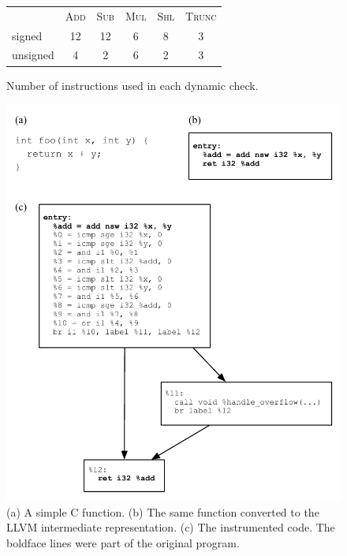 \documentclass[preprint]{sigplanconf}[10pt]
\begin{document}
\begin{figure}[t!]
\begin{center}
\begin{small}
\renewcommand{\arraystretch}{1.5}
\begin{tabular}{lccccc}
& \textsc{Add} & \textsc{Sub} & \textsc{Mul} & \textsc{Shl} & \textsc{Trunc} \\
signed   & 12 & 12 & 6 & 8 & 3 \\
unsigned & 4  & 2  & 6 & 2 & 3
\end{tabular}
\end{small}
\caption{\label{fig:num_instructions}
Number of instructions used in each dynamic check.}
\end{center}
\end{figure}

\begin{figure}[t!]
\begin{center}
\includegraphics[width=\columnwidth]{images/instrumented_cfg}
\end{center}
\caption{\label{fig:instrumented_cfg}
(a) A simple C function.
(b) The same function converted to the LLVM intermediate representation.
(c) The instrumented code. The boldface lines were part of the original
program.}
\end{figure}
\end{document}
